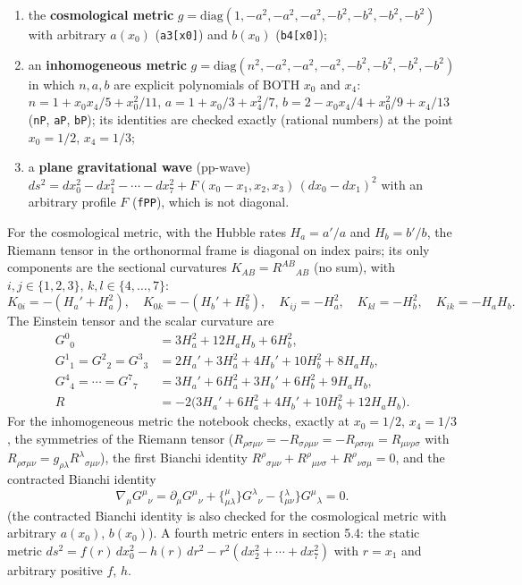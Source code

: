 \documentclass[10pt,a4paper]{article}
\begin{document}
\begin{enumerate}
\item the \textbf{cosmological metric} $g=\mathrm{diag}(1,-a^2,-a^2,-a^2,-b^2,-b^2,-b^2,-b^2)$ with arbitrary $a(x_0)$ (\texttt{a3[x0]}) and $b(x_0)$ (\texttt{b4[x0]});
\item an \textbf{inhomogeneous metric} $g=\mathrm{diag}(n^2,-a^2,-a^2,-a^2,-b^2,-b^2,-b^2,-b^2)$ in which $n,a,b$ are explicit polynomials of BOTH $x_0$ and $x_4$: $n=1+x_0x_4/5+x_0^2/11$, $a=1+x_0/3+x_4^2/7$, $b=2-x_0x_4/4+x_0^2/9+x_4/13$ (\texttt{nP}, \texttt{aP}, \texttt{bP}); its identities are checked exactly (rational numbers) at the point $x_0=1/2$, $x_4=1/3$;
\item a \textbf{plane gravitational wave} (pp-wave) $ds^2=dx_0^2-dx_1^2-\cdots-dx_7^2+F(x_0-x_1,x_2,x_3)\,(dx_0-dx_1)^2$ with an arbitrary profile $F$ (\texttt{fPP}), which is not diagonal.
\end{enumerate}
For the cosmological metric, with the Hubble rates $H_a=a'/a$ and $H_b=b'/b$, the Riemann tensor in the orthonormal frame is diagonal on index pairs; its only components are the sectional curvatures $K_{AB}=R^{AB}{}_{AB}$ (no sum), with $i,j\in\lbrace1,2,3\rbrace$, $k,l\in\lbrace4,\dots,7\rbrace$:
\begin{equation*}
K_{0i}=-(H_a'+H_a^2),\quad K_{0k}=-(H_b'+H_b^2),\quad K_{ij}=-H_a^2,\quad K_{kl}=-H_b^2,\quad K_{ik}=-H_aH_b .
\end{equation*}
The Einstein tensor and the scalar curvature are
\begin{align*}
G^0{}_0&=3H_a^2+12H_aH_b+6H_b^2, \\
G^1{}_1=G^2{}_2=G^3{}_3&=2H_a'+3H_a^2+4H_b'+10H_b^2+8H_aH_b, \\
G^4{}_4=\cdots=G^7{}_7&=3H_a'+6H_a^2+3H_b'+6H_b^2+9H_aH_b, \\
R&=-2\big(3H_a'+6H_a^2+4H_b'+10H_b^2+12H_aH_b\big).
\end{align*}
For the inhomogeneous metric the notebook checks, exactly at $x_0=1/2$, $x_4=1/3$, the symmetries of the Riemann tensor ($R_{\rho\sigma\mu\nu}=-R_{\sigma\rho\mu\nu}=-R_{\rho\sigma\nu\mu}=R_{\mu\nu\rho\sigma}$ with $R_{\rho\sigma\mu\nu}=g_{\rho\lambda}R^\lambda{}_{\sigma\mu\nu}$), the first Bianchi identity $R^\rho{}_{\sigma\mu\nu}+R^\rho{}_{\mu\nu\sigma}+R^\rho{}_{\nu\sigma\mu}=0$, and the contracted Bianchi identity
\begin{equation*}
\nabla_\mu G^{\mu}{}_{\nu}=\partial_\mu G^\mu{}_\nu+\{{}^{\mu}_{\mu\lambda}\}G^\lambda{}_\nu-\{{}^{\lambda}_{\mu\nu}\}G^\mu{}_\lambda=0 .
\end{equation*}
(the contracted Bianchi identity is also checked for the cosmological metric with arbitrary $a(x_0)$, $b(x_0)$). A fourth metric enters in section 5.4: the static metric $ds^2=f(r)\,dx_0^2-h(r)\,dr^2-r^2(dx_2^2+\cdots+dx_7^2)$ with $r=x_1$ and arbitrary positive $f$, $h$.
\end{document}
